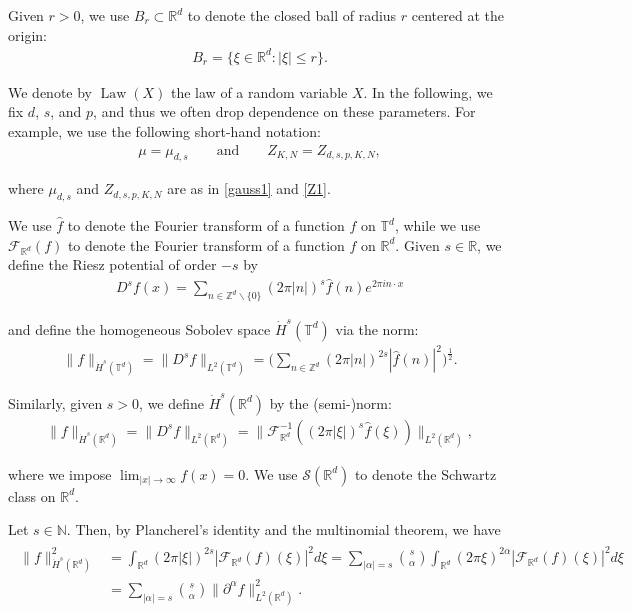 \documentclass[letterpaper, 11pt,  reqno]{amsart}
\newcommand{\noi}{\noindent}
\newcommand{\Z}{\mathbb{Z}}
\newcommand{\R}{\mathbb{R}}
\newcommand{\T}{\mathbb{T}}
\newcommand{\F}{\mathcal{F}}
\newcommand{\al}{\alpha}
\newcommand{\ft}{\widehat}
\newcommand{\dd}{\partial}
\renewcommand{\S}{\mathcal{S}}
\newcommand{\N}{\mathbb{N}}
\numberwithin{equation}{section}
\numberwithin{theorem}{section}
\DeclareMathOperator{\Law}{Law}
\begin{document}
Given $r > 0$, we use $B_r \subset \R^d $ to denote the closed ball of radius $r$ centered at the origin:
\begin{align}
B_r = \{ \xi \in \R^d: |\xi|\le r\}.
\label{ball1}
\end{align}


We denote by $\Law(X)$ the law of
a random variable $X$. 
In the following, we fix $d$, $s$, and $p$,  and thus
we often drop dependence on these parameters.
For example, 
we use the following short-hand notation:
\begin{align*}
\mu = \mu_{d, s} \qquad\text{and}\qquad
Z_{K, N} = Z_{d, s, p, K, N}, 
\end{align*}

\noi
where  $\mu_{d, s}$ and $Z_{d, s, p, K, N}$ are
as  in \eqref{gauss1} and \eqref{Z1}.



We use $\ft f$ to denote the Fourier transform of a function $f$ on $\T^d$, 
while we use $\F_{\R^d}(f)$ 
to denote the Fourier transform of a function $f$ on $\R^d$.
Given $s \in \R$, we define the Riesz potential of order $-s$ 
by 
\begin{align}
D^s f (x) = \sum_{n \in \mathbb{Z}^d \backslash \{ 0 \}} 
(2\pi | n|)^s \ft f (n) e^{2\pi i n \cdot x} 
\label{Riesz1}
\end{align}

\noi
and define the homogeneous Sobolev space $\dot H^s(\T^d)$ via the norm:
\begin{align*}
\| f \|_{\dot H^{s}(\mathbb{T}^d)} = \| D^{s} f \|_{L^2(\mathbb{T}^d)}
=\bigg(\sum_{n\in \Z^{d}}(2\pi |n|)^{2s}|\widehat{f}(n)|^2\bigg)^\frac 12 .
\end{align*}

\noi
Similarly, given $ s > 0$, we define $\dot H^s(\R^d)$ by the (semi-)norm:
\begin{align*}
\|f\|_{\dot H^{s}(\R^d)}
 = \| D^{s} f \|_{L^2(\R^d)}
=\|\mathcal{F}_{\R^d}^{-1}((2\pi |\xi|)^{s}\widehat{f}(\xi))\|_{L^{2}(\R^d)}, 
\end{align*}

\noi
where we impose $\lim_{|x|\to \infty} f(x) = 0$.
We use $\S(\R^d)$ to denote the Schwartz class on $\R^d$.

Let $s \in \N$. Then, by Plancherel's identity and 
 the multinomial theorem, we have 
\begin{align}
\begin{split}
\|f\|^2_{\dot{H}^{s}(\R^d)}&=
\int_{\R^d} 
(2\pi |\xi|)^{2s}|\F_{\R^d}(f)(\xi)|^2 d\xi
=\sum_{|\alpha|=s}\binom{s}{\alpha}
\int_{\R^d} 
(2\pi \xi)^{2\al}|\F_{\R^d}(f)(\xi)|^2 d\xi\\
&=\sum_{|\alpha|=s}\binom{s}{\alpha}\|\dd^\al f\|^2_{L^{2}(\R^d)}.
\end{split}
\label{Hs4}
\end{align}
\end{document}
